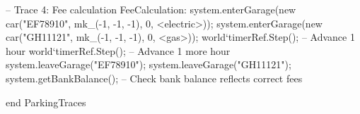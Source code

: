 \documentclass[a4paper]{article}
\begin{document}
\begin{vdm_al}
    -- Trace 4: Fee calculation
    FeeCalculation:
        system.enterGarage(new car("EF78910", mk_(-1, -1, -1), 0, <electric>));
        system.enterGarage(new car("GH11121", mk_(-1, -1, -1), 0, <gas>));
        world`timerRef.Step();  -- Advance 1 hour
        world`timerRef.Step();  -- Advance 1 more hour
        system.leaveGarage("EF78910");
        system.leaveGarage("GH11121");
        system.getBankBalance();  -- Check bank balance reflects correct fees






end ParkingTraces
\end{vdm_al}
\end{document}
